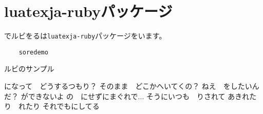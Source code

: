 \section{luatexja-rubyパッケージ}

でルビをるは\texttt{luatexja-ruby}パッケージをいます。

\begin{listing}
\begin{verbatim}
    soredemo
\end{verbatim}
  \caption{ルビのサンプル}
\end{listing}

になって　どうするつもり？
そのまま　どこかへいてくの？
ねえ　をしたいんだ？
ができないよ
の　にせずにまぐれで...
そうにいつも　りされて
あきれたり　れたり
それでもにしてる

